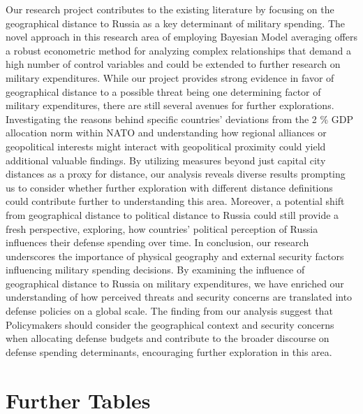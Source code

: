 \documentclass[12pt,a4paper]{article}
\begin{document}
Our research project contributes to the existing literature by focusing on the geographical distance to Russia as a key determinant of military spending. The novel approach in this research area of employing Bayesian Model averaging offers a robust econometric method for analyzing complex relationships that demand a high number of control variables and could be extended to further research on military expenditures. 
While our project provides strong evidence in favor of geographical distance to a possible threat being one determining factor of military expenditures, there are still several avenues for further explorations. Investigating the reasons behind specific countries’ deviations from the 2 \% GDP allocation norm within NATO and understanding how regional alliances or geopolitical interests might interact with geopolitical proximity could yield additional valuable findings. 
By utilizing measures beyond just capital city distances as a proxy for distance, our analysis reveals diverse results prompting us to consider whether further exploration with different distance definitions could contribute further to understanding this area. Moreover, a potential shift from geographical distance to political distance to Russia could still provide a fresh perspective, exploring, how countries’ political perception of Russia influences their defense spending over time.
In conclusion, our research underscores the importance of physical geography and external security factors influencing military spending decisions. By examining the influence of geographical distance to Russia on military expenditures, we have enriched our understanding of how perceived threats and security concerns are translated into defense policies on a global scale. The finding from our analysis suggest that Policymakers should consider the geographical context and security concerns when allocating defense budgets and contribute to the broader discourse on defense spending determinants, encouraging further exploration in this area.




\clearpage


\setcounter{page}{\thesavepage}
\pagestyle{plain}


\clearpage
\appendix
\section{Further Tables}
\label{Appendix Tables}
\end{document}
